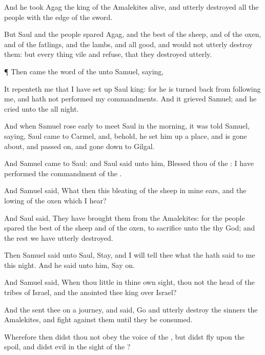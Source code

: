 {And he
took
Agag the
king of the
Amalekites
alive, and utterly
destroyed all the
people with the
edge of the
sword.

But
Saul and the
people
spared
Agag, and the
best of the
sheep, and of the
oxen, and of the
fatlings, and the
lambs, and all
{}
good, and
would not utterly
destroy them: but every
thing
{}
vile and
refuse, that they destroyed
utterly.


\par }{\PP {}¶ Then came the
word of the
{} unto
Samuel,
saying,

It
repenteth me that I have set
up
Saul
{}
king: for he is turned
back from
following me, and hath not
performed my
commandments. And it
grieved
Samuel; and he
cried unto the
{} all
night.

And when
Samuel rose
early to
meet
Saul in the
morning, it was
told
Samuel,
saying,
Saul
came to
Carmel, and, behold, he set him
up a
place, and is gone
about, and passed
on, and gone
down to
Gilgal.

And
Samuel
came to
Saul: and
Saul
said unto him,
Blessed
{} thou of the
{}: I have
performed the
commandment of the
{}.

And
Samuel
said, What
{} then this
bleating of the
sheep in mine
ears, and the
lowing of the
oxen which I
hear?

And
Saul
said, They have
brought them from the
Amalekites: for the
people
spared the
best of the
sheep and of the
oxen, to
sacrifice unto the
{} thy
God; and the
rest we have utterly
destroyed.

Then
Samuel
said unto
Saul,
Stay, and I will
tell thee what the
{} hath
said to me this
night. And he
said unto him, Say
on.

And
Samuel
said, When thou
{}
little in thine own
sight,
{} thou not
{} the
head of the
tribes of
Israel, and the
{}
anointed thee
king over
Israel?

And the
{}
sent thee on a
journey, and
said,
Go and utterly
destroy the
sinners the
Amalekites, and
fight against them until they be
consumed.

Wherefore then didst thou not
obey the
voice of the
{}, but didst
fly upon the
spoil, and
didst
evil in the
sight of the
{}?

}
